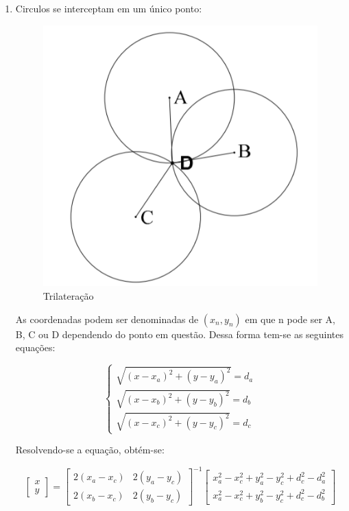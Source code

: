 \begin{enumerate}

	\item Circulos se interceptam em um único ponto:
	
	\begin{figure}[H]
		\centering 
		\includegraphics[scale = 1]{images/trilateration.png}
		\caption{Trilateração \cite{art12}}
		\label{fig:trilateration.png}
	\end{figure}
	
	
	As coordenadas podem ser denominadas de \( (x_n, y_n) \) em que n pode ser A, B, C ou D dependendo do ponto em questão. Dessa forma tem-se as seguintes equações:
	
	\begin{equation*}
	\begin{cases} \sqrt{(x - x_a)^2 + (y - y_a)^2} = d_a \\ \sqrt{(x - x_b)^2 + (y - y_b)^2} = d_b \\ \sqrt{(x - x_c)^2 + (y - y_c)^2} = d_c \end{cases}
	\end{equation*}
	
	Resolvendo-se a equação, obtém-se:
	
	\begin{equation*}
	\begin{bmatrix} 
		x \\
		y
	\end{bmatrix} = 
	\begin{bmatrix} 
		2(x_a - x_c) & 2(y_a - y_c) \\
		2(x_b - x_c) & 2(y_b - y_c)
	\end{bmatrix}^{-1}
	\begin{bmatrix} 
		x_a^2 - x_c^2 + y_a^2 - y_c^2 + d_c^2 - d_a^2 \\
		x_a^2 - x_c^2 + y_b^2 - y_c^2 + d_c^2 - d_b^2
	\end{bmatrix}
	\end{equation*}


\end{enumerate}	




